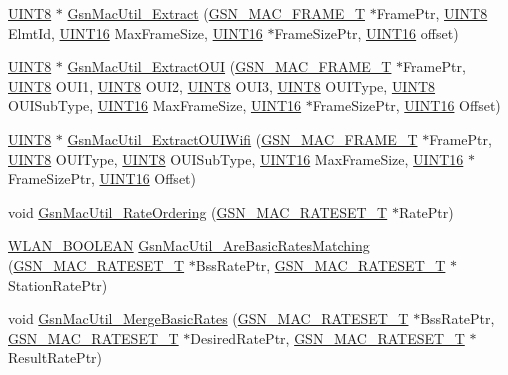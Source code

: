 \begin{DoxyCompactItemize}
\item 
\hyperlink{a00660_gab27e9918b538ce9d8ca692479b375b6a}{UINT8} $\ast$ \hyperlink{a00524_a44255cdf1ce2d41c92461ce654f338bb}{GsnMacUtil\_\-Extract} (\hyperlink{a00116}{GSN\_\-MAC\_\-FRAME\_\-T} $\ast$FramePtr, \hyperlink{a00660_gab27e9918b538ce9d8ca692479b375b6a}{UINT8} ElmtId, \hyperlink{a00660_ga09f1a1fb2293e33483cc8d44aefb1eb1}{UINT16} MaxFrameSize, \hyperlink{a00660_ga09f1a1fb2293e33483cc8d44aefb1eb1}{UINT16} $\ast$FrameSizePtr, \hyperlink{a00660_ga09f1a1fb2293e33483cc8d44aefb1eb1}{UINT16} offset)
\item 
\hyperlink{a00660_gab27e9918b538ce9d8ca692479b375b6a}{UINT8} $\ast$ \hyperlink{a00524_a290db09cebd8438817d9c722ccf4819a}{GsnMacUtil\_\-ExtractOUI} (\hyperlink{a00116}{GSN\_\-MAC\_\-FRAME\_\-T} $\ast$FramePtr, \hyperlink{a00660_gab27e9918b538ce9d8ca692479b375b6a}{UINT8} OUI1, \hyperlink{a00660_gab27e9918b538ce9d8ca692479b375b6a}{UINT8} OUI2, \hyperlink{a00660_gab27e9918b538ce9d8ca692479b375b6a}{UINT8} OUI3, \hyperlink{a00660_gab27e9918b538ce9d8ca692479b375b6a}{UINT8} OUIType, \hyperlink{a00660_gab27e9918b538ce9d8ca692479b375b6a}{UINT8} OUISubType, \hyperlink{a00660_ga09f1a1fb2293e33483cc8d44aefb1eb1}{UINT16} MaxFrameSize, \hyperlink{a00660_ga09f1a1fb2293e33483cc8d44aefb1eb1}{UINT16} $\ast$FrameSizePtr, \hyperlink{a00660_ga09f1a1fb2293e33483cc8d44aefb1eb1}{UINT16} Offset)
\item 
\hyperlink{a00660_gab27e9918b538ce9d8ca692479b375b6a}{UINT8} $\ast$ \hyperlink{a00524_ac5cb1611a7a723049c313e8abbeba4d6}{GsnMacUtil\_\-ExtractOUIWifi} (\hyperlink{a00116}{GSN\_\-MAC\_\-FRAME\_\-T} $\ast$FramePtr, \hyperlink{a00660_gab27e9918b538ce9d8ca692479b375b6a}{UINT8} OUIType, \hyperlink{a00660_gab27e9918b538ce9d8ca692479b375b6a}{UINT8} OUISubType, \hyperlink{a00660_ga09f1a1fb2293e33483cc8d44aefb1eb1}{UINT16} MaxFrameSize, \hyperlink{a00660_ga09f1a1fb2293e33483cc8d44aefb1eb1}{UINT16} $\ast$FrameSizePtr, \hyperlink{a00660_ga09f1a1fb2293e33483cc8d44aefb1eb1}{UINT16} Offset)
\item 
void \hyperlink{a00524_a4ce2d9a9ad86040826c2f88c4ce82882}{GsnMacUtil\_\-RateOrdering} (\hyperlink{a00125}{GSN\_\-MAC\_\-RATESET\_\-T} $\ast$RatePtr)
\item 
\hyperlink{a00642_ga7fb691c78d3a1046fa998bae1560e1a5}{WLAN\_\-BOOLEAN} \hyperlink{a00524_af71c6b481d7a6271466b8bd675670e4c}{GsnMacUtil\_\-AreBasicRatesMatching} (\hyperlink{a00125}{GSN\_\-MAC\_\-RATESET\_\-T} $\ast$BssRatePtr, \hyperlink{a00125}{GSN\_\-MAC\_\-RATESET\_\-T} $\ast$StationRatePtr)
\item 
void \hyperlink{a00524_a5887858097eff90d7d92315fc3f68dc7}{GsnMacUtil\_\-MergeBasicRates} (\hyperlink{a00125}{GSN\_\-MAC\_\-RATESET\_\-T} $\ast$BssRatePtr, \hyperlink{a00125}{GSN\_\-MAC\_\-RATESET\_\-T} $\ast$DesiredRatePtr, \hyperlink{a00125}{GSN\_\-MAC\_\-RATESET\_\-T} $\ast$ResultRatePtr)

\end{DoxyCompactItemize}
